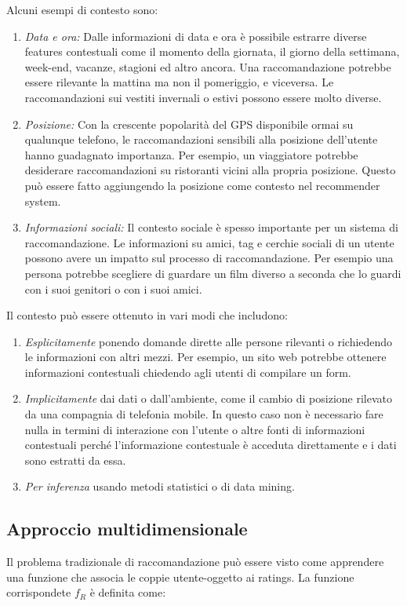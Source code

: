 \documentclass[12pt,italian]{report}
\begin{document}
\noindent Alcuni esempi di contesto sono:
\begin{enumerate}
 \item \textit{Data e ora:} Dalle informazioni di data e ora è possibile estrarre diverse features contestuali come il momento della giornata, il giorno della settimana, week-end, vacanze, stagioni ed altro ancora. Una raccomandazione potrebbe essere rilevante la mattina ma non il pomeriggio, e viceversa. Le raccomandazioni sui vestiti invernali o estivi possono essere molto diverse.
 \item \textit{Posizione:} Con la crescente popolarità del GPS disponibile ormai su qualunque telefono, le raccomandazioni sensibili alla posizione dell'utente hanno guadagnato importanza. Per esempio, un viaggiatore potrebbe desiderare raccomandazioni su ristoranti vicini alla propria posizione. Questo può essere fatto aggiungendo la posizione come contesto nel recommender system.
 \item \textit{Informazioni sociali:} Il contesto sociale è spesso importante per un sistema di raccomandazione. Le informazioni su amici, tag e cerchie sociali di un utente possono avere un impatto sul processo di raccomandazione. Per esempio una persona potrebbe scegliere di guardare un film diverso a seconda che lo guardi con i suoi genitori o con i suoi amici.
\end{enumerate} 

\noindent Il contesto può essere ottenuto in vari modi \cite{recsys-handbook} che includono:
\begin{enumerate}
 \item \textit{Esplicitamente} ponendo domande dirette alle persone rilevanti o richiedendo le informazioni con altri mezzi. Per esempio, un sito web potrebbe ottenere informazioni contestuali chiedendo agli utenti di compilare un form.
 \item \textit{Implicitamente} dai dati o dall'ambiente, come il cambio di posizione rilevato da una compagnia di telefonia mobile. In questo caso non è necessario fare nulla in termini di interazione con l'utente o altre fonti di informazioni contestuali perché l'informazione contestuale è acceduta direttamente e i dati sono estratti da essa.
 \item \textit{Per inferenza} usando metodi statistici o di data mining. 
\end{enumerate}

\subsection{Approccio multidimensionale}
Il problema tradizionale di raccomandazione può essere visto come apprendere una funzione che associa le coppie utente-oggetto ai ratings. La funzione corrispondete $f_R$ è definita come:
\end{document}
